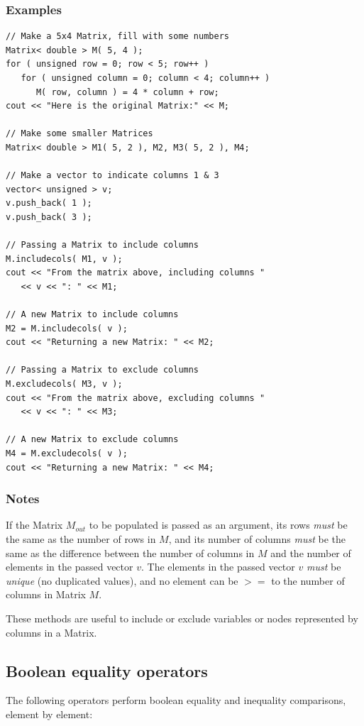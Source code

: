 \documentclass{report}
\begin{document}
\subsubsection{Examples}

\begin{verbatim}
// Make a 5x4 Matrix, fill with some numbers
Matrix< double > M( 5, 4 );
for ( unsigned row = 0; row < 5; row++ )
   for ( unsigned column = 0; column < 4; column++ )
      M( row, column ) = 4 * column + row;
cout << "Here is the original Matrix:" << M;

// Make some smaller Matrices
Matrix< double > M1( 5, 2 ), M2, M3( 5, 2 ), M4;

// Make a vector to indicate columns 1 & 3
vector< unsigned > v;
v.push_back( 1 );
v.push_back( 3 );

// Passing a Matrix to include columns
M.includecols( M1, v );
cout << "From the matrix above, including columns "
   << v << ": " << M1;

// A new Matrix to include columns
M2 = M.includecols( v );
cout << "Returning a new Matrix: " << M2;

// Passing a Matrix to exclude columns
M.excludecols( M3, v );
cout << "From the matrix above, excluding columns "
   << v << ": " << M3;

// A new Matrix to exclude columns
M4 = M.excludecols( v );
cout << "Returning a new Matrix: " << M4;
\end{verbatim}

\subsubsection{Notes}
If the Matrix $M_{out}$ to be populated is passed as an argument, its
rows {\em must} be the same as the number of rows in $M$, and its
number of columns {\em must} be the same as the difference between the
number of columns in $M$ and the number of elements in the passed
vector $v$.  The elements in the passed vector $v$ {\em must} be {\em
unique} (no duplicated values), and no element can be $>=$ to the
number of columns in Matrix $M$.

These methods are useful to include or exclude variables or nodes
represented by columns in a Matrix.

\subsection{Boolean equality operators}

The following operators perform boolean equality and inequality
comparisons, element by element:
\end{document}
